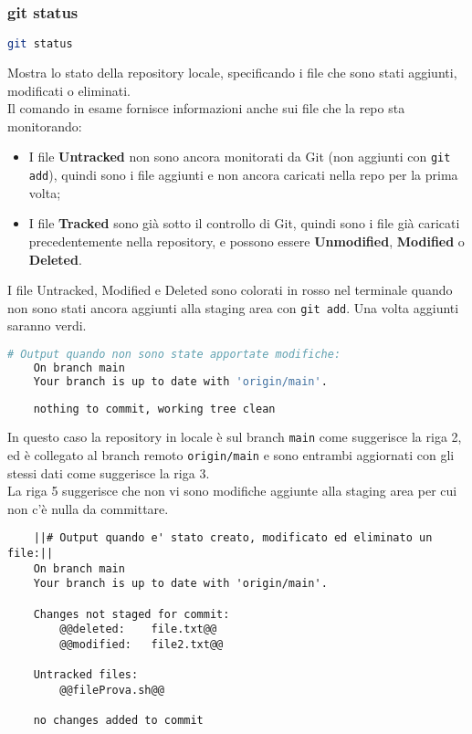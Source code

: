 \subsubsection{git status}
\begin{lstlisting}[language=bash]
	git status
\end{lstlisting}
Mostra lo stato della repository locale, specificando i file che sono stati aggiunti, modificati o eliminati.\\
Il comando in esame fornisce informazioni anche sui file che la repo sta monitorando:
\begin{itemize}[noitemsep, topsep=3pt]
	\item I file \textbf{Untracked} non sono ancora monitorati da Git (non aggiunti con \texttt{git add}), quindi sono i file aggiunti e non ancora caricati nella repo per la prima volta;
	\item I file \textbf{Tracked} sono già sotto il controllo di Git, quindi sono i file già caricati precedentemente nella repository, e possono essere \textbf{Unmodified}, \textbf{Modified} o \textbf{Deleted}.
\end{itemize}
I file Untracked, Modified e Deleted sono colorati in rosso nel terminale quando non sono stati ancora aggiunti alla staging area con \texttt{git add}. Una volta aggiunti saranno verdi.\\
\begin{lstlisting}[language=bash]
	# Output quando non sono state apportate modifiche:
	On branch main
	Your branch is up to date with 'origin/main'.
	
	nothing to commit, working tree clean
\end{lstlisting}
In questo caso la repository in locale è sul branch \texttt{main} come suggerisce la riga 2, ed è collegato al branch remoto \texttt{origin/main} e sono entrambi aggiornati con gli stessi dati come suggerisce la riga 3.\\
La riga 5 suggerisce che non vi sono modifiche aggiunte alla staging area per cui non c'è nulla da committare.
\begin{lstlisting}
	||# Output quando e' stato creato, modificato ed eliminato un file:||
	On branch main
	Your branch is up to date with 'origin/main'.
	
	Changes not staged for commit:
		@@deleted:    file.txt@@
		@@modified:   file2.txt@@
	
	Untracked files:  
		@@fileProva.sh@@
	
	no changes added to commit
\end{lstlisting}


